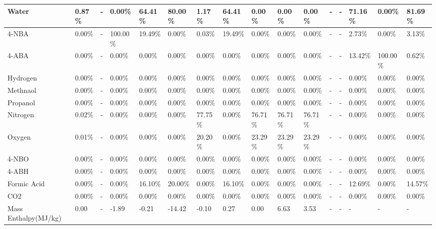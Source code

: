 \begin{landscape}
\begin{table}[H]
\begin{tabular}{|l|l|l|l|l|l|l|l|l|l|l|l|l|l|l|l|}
Water                   & 0.87\%  & -    & 0.00\%   & 64.41\% & 80.00\% & 1.17\%  & 64.41\% & 0.00\%  & 0.00\%  & 0.00\%  & -    & -    & 71.16\% & 0.00\%   & 81.69\% \\ \hline
4-NBA                   & 0.00\%  & -    & 100.00\% & 19.49\% & 0.00\%  & 0.03\%  & 19.49\% & 0.00\%  & 0.00\%  & 0.00\%  & -    & -    & 2.73\%  & 0.00\%   & 3.13\%  \\ \hline
4-ABA                   & 0.00\%  & -    & 0.00\%   & 0.00\%  & 0.00\%  & 0.00\%  & 0.00\%  & 0.00\%  & 0.00\%  & 0.00\%  & -    & -    & 13.42\% & 100.00\% & 0.62\%  \\ \hline
Hydrogen                & 0.00\%  & -    & 0.00\%   & 0.00\%  & 0.00\%  & 0.00\%  & 0.00\%  & 0.00\%  & 0.00\%  & 0.00\%  & -    & -    & 0.00\%  & 0.00\%   & 0.00\%  \\ \hline
Methnaol                & 0.00\%  & -    & 0.00\%   & 0.00\%  & 0.00\%  & 0.00\%  & 0.00\%  & 0.00\%  & 0.00\%  & 0.00\%  & -    & -    & 0.00\%  & 0.00\%   & 0.00\%  \\ \hline
Propanol                & 0.00\%  & -    & 0.00\%   & 0.00\%  & 0.00\%  & 0.00\%  & 0.00\%  & 0.00\%  & 0.00\%  & 0.00\%  & -    & -    & 0.00\%  & 0.00\%   & 0.00\%  \\ \hline
Nitrogen                & 0.02\%  & -    & 0.00\%   & 0.00\%  & 0.00\%  & 77.75\% & 0.00\%  & 76.71\% & 76.71\% & 76.71\% & -    & -    & 0.00\%  & 0.00\%   & 0.00\%  \\ \hline
Oxygen                  & 0.01\%  & -    & 0.00\%   & 0.00\%  & 0.00\%  & 20.20\% & 0.00\%  & 23.29\% & 23.29\% & 23.29\% & -    & -    & 0.00\%  & 0.00\%   & 0.00\%  \\ \hline
4-NBO                   & 0.00\%  & -    & 0.00\%   & 0.00\%  & 0.00\%  & 0.00\%  & 0.00\%  & 0.00\%  & 0.00\%  & 0.00\%  & -    & -    & 0.00\%  & 0.00\%   & 0.00\%  \\ \hline
4-ABH                   & 0.00\%  & -    & 0.00\%   & 0.00\%  & 0.00\%  & 0.00\%  & 0.00\%  & 0.00\%  & 0.00\%  & 0.00\%  & -    & -    & 0.00\%  & 0.00\%   & 0.00\%  \\ \hline
Formic Acid             & 0.00\%  & -    & 0.00\%   & 16.10\% & 20.00\% & 0.00\%  & 16.10\% & 0.00\%  & 0.00\%  & 0.00\%  & -    & -    & 12.69\% & 0.00\%   & 14.57\% \\ \hline
CO2                     & 0.00\%  & -    & 0.00\%   & 0.00\%  & 0.00\%  & 0.00\%  & 0.00\%  & 0.00\%  & 0.00\%  & 0.00\%  & -    & -    & 0.00\%  & 0.00\%   & 0.00\%  \\ \hline
Mass Enthalpy(MJ/kg)    & 0.00    & -    & -1.89    & -0.21   & -14.42  & -0.10   & 0.27    & 0.00    & 6.63    & 3.53    & -    & -    & -       & -        & -       \\ \hline
\end{tabular}
\end{table}


\end{landscape}
